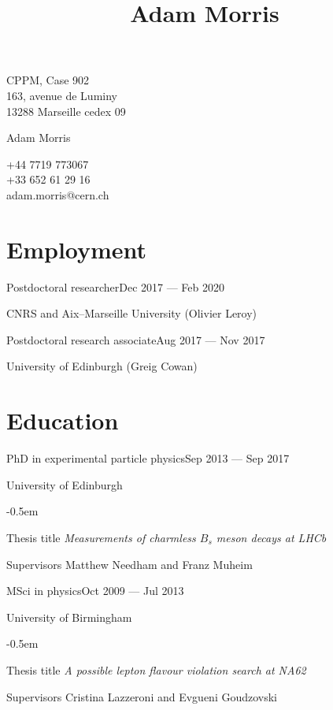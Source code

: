 \documentclass[contbibnum,titleabove]{simplecv}
\title{Adam Morris}
\newcommand\dateditem[2]{\vspace{0.5em}#1\hfill#2\par}
\newcommand\topictitle[3]{\par\dateditem{#1}{#3}{\color{darkgray}#2}}
\begin{document}
	\fontfamily{\typeface}\selectfont
	\noindent\begin{minipage}{0.33\textwidth}
	CPPM, Case 902\\163, avenue de Luminy\\13288 Marseille cedex 09
	\end{minipage}
	\noindent\begin{minipage}{0.33\textwidth}
	\centering
	\Huge Adam Morris
	\end{minipage}
	\noindent\begin{minipage}{0.33\textwidth}
	\raggedleft
	+44 7719 773067\\+33 652 61 29 16\\{adam.morris@cern.ch}
	\end{minipage}
	\section{Employment}
	\topictitle{Postdoctoral researcher}{CNRS and Aix--Marseille University (Olivier Leroy)}{Dec 2017 --- Feb 2020}
	\topictitle{Postdoctoral research associate}{University of Edinburgh (Greig Cowan)}{Aug 2017 --- Nov 2017}
	\section{Education}
	\topictitle{PhD in experimental particle physics}{University of Edinburgh}{Sep 2013 --- Sep 2017}
	\begin{topic}
	\itemsep-0.5em
		\item[Thesis title]{\textit{Measurements of charmless $B_s$ meson decays at LHCb}}
		\item[Supervisors]{Matthew Needham and Franz Muheim}
	\end{topic}
	\topictitle{MSci in physics}{University of Birmingham}{Oct 2009 --- Jul 2013}
	\begin{topic}
		\itemsep-0.5em
		\item[Thesis title]{\textit{A possible lepton flavour violation search at NA62}}
		\item[Supervisors]{Cristina Lazzeroni and Evgueni Goudzovski}
	\end{topic}
\end{document}
